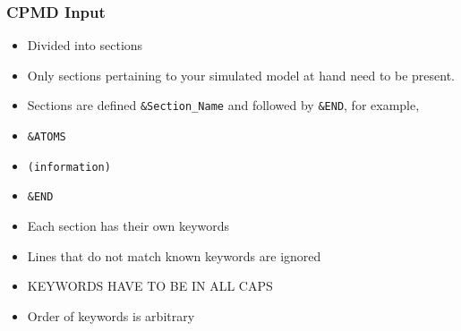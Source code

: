 \documentclass[slidestop,mathserif,compress,xcolor=svgnames]{beamer}
\begin{document}
\begin{frame}
  \frametitle{\small CPMD Input}
  \scriptsize{
  \begin{block}{}
    \begin{itemize}
      \item Divided into sections
      \item Only sections pertaining to your simulated model at hand need to be present.
      \item Sections are defined \texttt{\&Section\_Name} and followed by \texttt{\&END}, for example,
      \item[]\texttt{\&ATOMS}  
      \item[]\texttt{\quad(information)}
      \item[]\texttt{\&END}
      \item Each section has their own keywords
      \item Lines that do not match known keywords are ignored
      \item KEYWORDS HAVE TO BE IN ALL CAPS
      \item Order of keywords is arbitrary
    \end{itemize}
  \end{block}
  }
\end{frame}
\end{document}

